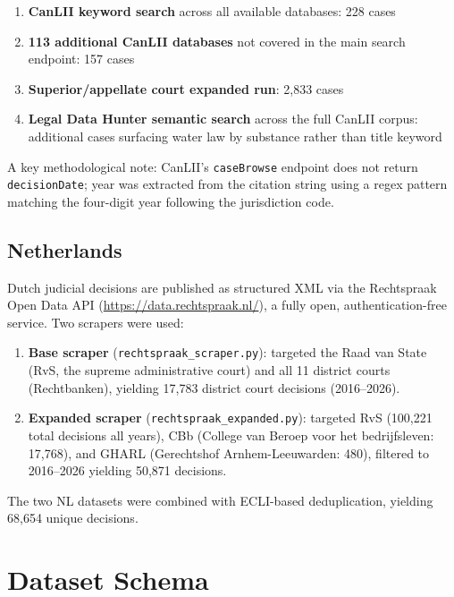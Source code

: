 \documentclass[12pt]{article}
\begin{document}
\begin{enumerate}[noitemsep]
  \item \textbf{CanLII keyword search} across all available databases: 228 cases
  \item \textbf{113 additional CanLII databases} not covered in the main search endpoint: 157 cases
  \item \textbf{Superior/appellate court expanded run}: 2,833 cases
  \item \textbf{Legal Data Hunter semantic search} across the full CanLII corpus: additional cases surfacing water law by substance rather than title keyword
\end{enumerate}

A key methodological note: CanLII's \texttt{caseBrowse} endpoint does not return \texttt{decisionDate}; year was extracted from the citation string using a regex pattern matching the four-digit year following the jurisdiction code.

\subsection{Netherlands}

Dutch judicial decisions are published as structured XML via the Rechtspraak Open Data API (\url{https://data.rechtspraak.nl/}), a fully open, authentication-free service. Two scrapers were used:

\begin{enumerate}[noitemsep]
  \item \textbf{Base scraper} (\texttt{rechtspraak\_scraper.py}): targeted the Raad van State (RvS, the supreme administrative court) and all 11 district courts (Rechtbanken), yielding 17,783 district court decisions (2016--2026).
  \item \textbf{Expanded scraper} (\texttt{rechtspraak\_expanded.py}): targeted RvS (100,221 total decisions all years), CBb (College van Beroep voor het bedrijfsleven: 17,768), and GHARL (Gerechtshof Arnhem-Leeuwarden: 480), filtered to 2016--2026 yielding 50,871 decisions.
\end{enumerate}

The two NL datasets were combined with ECLI-based deduplication, yielding 68,654 unique decisions.

\section{Dataset Schema}
\end{document}
